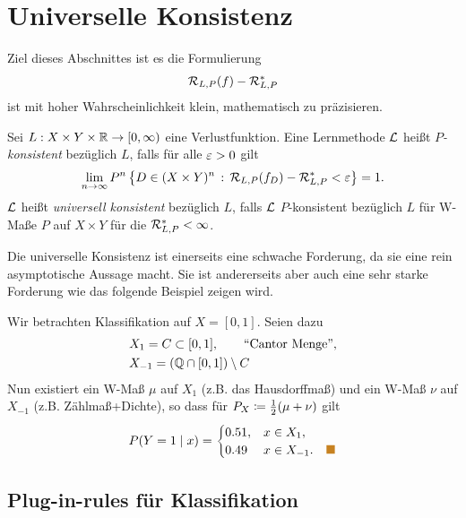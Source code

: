 \section{Universelle Konsistenz}
\label{chap:1.3}

Ziel dieses Abschnittes ist es die Formulierung
\begin{align*}
\mathcal{R}_{L,P}(f)-\mathcal{R}_{L,P}^*
\end{align*}
ist mit hoher Wahrscheinlichkeit klein, mathematisch zu präzisieren.

\begin{defn}
\label{defn:1.3.1}
Sei $L:X\times Y\times \mathbb{R}\to [0,\infty)$ eine Verlustfunktion. Eine Lernmethode
$\mathcal{L}$ heißt \emph{$P$-konsistent} bezüglich $L$, falls für
alle $\varepsilon > 0$ gilt
\begin{align*}
\lim\limits_{n\to\infty} P^n\left\{ D\in (X\times Y)^n\,:\,\mathcal{R}_{L,P}(f_D) -
\mathcal{R}_{L,P}^* < \varepsilon\right\} = 1.
\end{align*}
$\mathcal{L}$ heißt \emph{universell konsistent} bezüglich
$L$, falls $\mathcal{L}$ $P$-konsistent bezüglich $L$ für W-Maße $P$ auf $X\times Y$ für die
$\mathcal{R}_{L,P}^* < \infty$.\fishhere
\end{defn}

Die universelle Konsistenz ist einerseits eine schwache Forderung, da sie eine
rein asymptotische Aussage macht. Sie ist andererseits aber auch eine sehr
starke Forderung wie das folgende Beispiel zeigen wird.

\begin{bsp*}
Wir betrachten Klassifikation auf $X=[0,1]$. Seien dazu
\begin{align*}
&X_1 = C\subset[0,1],\qquad \text{``Cantor Menge''},\\
&X_{-1} = (\mathbb{Q}\cap[0,1])\setminus C
\end{align*}
Nun existiert ein W-Maß $\mu$ auf $X_1$ (z.B. das Hausdorffmaß) und ein W-Maß
$\nu$ auf $X_{-1}$ (z.B. Zählmaß+Dichte), so dass für
 $P_X\coloneq\frac{1}{2}(\mu+\nu)$ gilt
\begin{align*}
P(Y=1\mid x) =
\begin{cases}
0.51, & x\in X_1,\\
0.49 & x\in X_{-1}.\bsphere
\end{cases}
\end{align*}
\end{bsp*}

\subsection{Plug-in-rules für Klassifikation}

